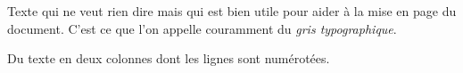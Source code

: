 \documentclass[%
]{EcoleLecture}
\begin{document}
\maketitle

Texte qui ne veut rien dire mais qui est bien utile pour aider à la mise en page du document. C'est ce que l'on appelle couramment du \emph{gris typographique}.

\begin{colonnes}
	Du texte en deux colonnes dont les lignes sont numérotées.
\end{colonnes}
\end{document}
